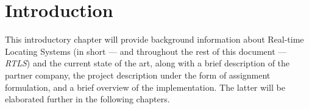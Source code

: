 \chapter{Introduction}\label{ch:intro}

This introductory chapter will provide background information about Real-time Locating Systems (in short --- and throughout the rest of this document --- \emph{RTLS}) and the current state of the art, along with a brief description of the partner company, the project description under the form of assignment formulation, and a brief overview of the implementation.
The latter will be elaborated further in the following chapters.








